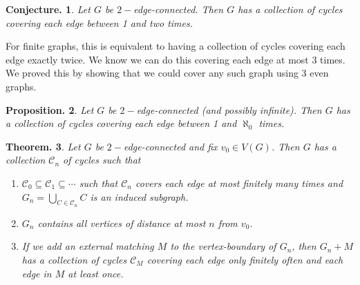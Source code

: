 \documentclass[11pt, a4paper]{memoir}
\theoremstyle{change}
\newtheorem{theorem}{Theorem.}[section]
\newtheorem{conjecture}[theorem]{Conjecture.}
\newtheorem{proposition}[theorem]{Proposition.}
\theoremstyle{plain}
\theoremstyle{nonumberplain}
\numberwithin{equation}{section}
\begin{document}
\begin{conjecture}
    Let $G$ be $2-$edge-connected.
    Then $G$ has a collection of cycles covering each edge between 1 and two times.
\end{conjecture}
For finite graphs, this is equivalent to having a collection of cycles covering each edge exactly twice.
We know we can do this covering each edge at most 3 times.
We proved this by showing that we could cover any such graph using 3 even graphs.
\begin{proposition}
    Let $G$ be $2-$edge-connected (and possibly infinite).
    Then $G$ has a collection of cycles covering each edge between 1 and $\aleph_0$ times.
\end{proposition}
\begin{theorem}
    Let $G$ be $2-$edge-connected and fix $v_0\in V(G)$.
    Then $G$ has a collection $\mathcal{C}_n$ of cycles such that
    \begin{enumerate}[nl,r]
        \item $\mathcal{C}_0\subseteq\mathcal{C}_1\subseteq\cdots$ such that $\mathcal{C}_n$ covers each edge at most finitely many times and $G_n=\bigcup_{C\in\mathcal{C}_n}C$ is an induced subgraph.
        \item $G_n$ contains all vertices of distance at most $n$ from $v_0$.
        \item If we add an external matching $M$ to the vertex-boundary of $G_n$, then $G_n+M$ has a collection of cycles $\mathcal{C}_M$ covering each edge only finitely often and each edge in $M$ at least once.
    \end{enumerate}
\end{theorem}
\end{document}
